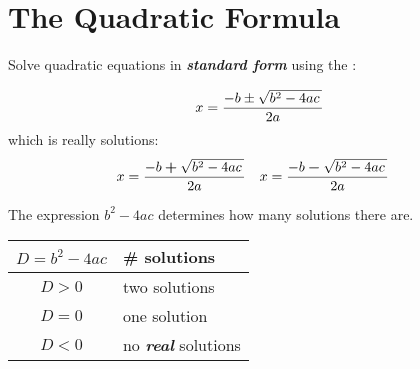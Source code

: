 \section{The Quadratic Formula}

Solve quadratic equations in {\bfseries\itshape standard form} 
using the :

\begin{tcolorbox}[
    center,
    width=5in,
    colback=black!5,
    colbacktitle=blue!10!white,
    coltitle=black,
    ]
    {
    \[
        x = \frac 
                {-b \pm \myRoot{b^2 - 4ac}}
                {2a}
    \]
    {\normalsize which is really  solutions:}
    \begin{align*} 
        x &= \frac 
        {-b \bm{+} \myRoot{b^2 - 4ac}}
        {2a}
        &
        x &= \frac 
        {-b \bm{-} \myRoot{b^2 - 4ac}}
        {2a}
    \end{align*}
    }
\end{tcolorbox}

\hfill 
\begin{minipage}{0.4\textwidth}
The expression $b^2-4ac$ determines {how many} solutions there are.
\end{minipage}
\hfill 
\begin{minipage}{0.55\textwidth}
\begin{center}
    \small
    \begin{tabular}{cl}
        $D = b^2-4ac$ & \# solutions \\
        \midrule
        $D > 0$ & two solutions \\
        $D = 0$ & one solution \\
        $D < 0$ & no {\bfseries\itshape real} solutions \\
    \end{tabular}
\end{center}
\end{minipage}
\hfill{}